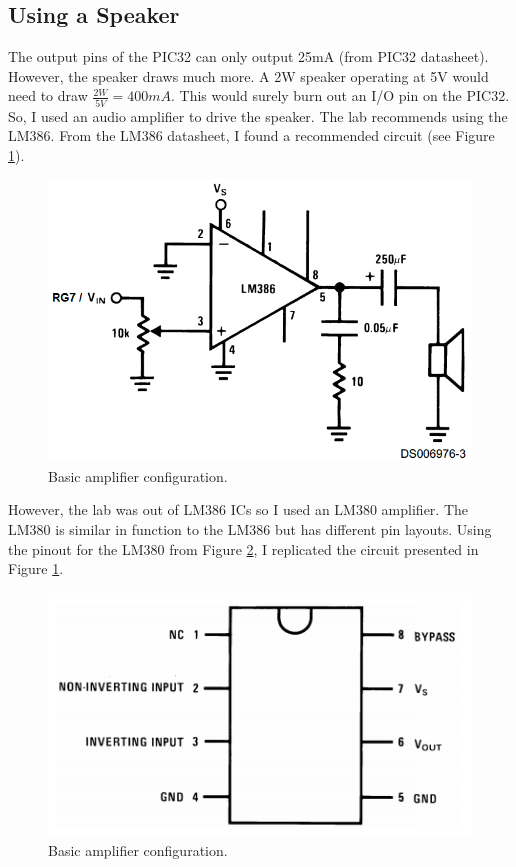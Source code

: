 \documentclass[11pt]{article}
\begin{document}
\subsection{Using a Speaker}

The output pins of the PIC32 can only output 25mA (from PIC32 datasheet). However, the speaker draws much more. A 2W speaker operating at 5V would need to draw $\frac{2W}{5V} = 400mA$. This would surely burn out an I/O pin on the PIC32. So, I used an audio amplifier to drive the speaker. The lab recommends using the LM386. From the LM386 datasheet, I found a recommended circuit (see Figure \ref{fig:amp_sch}). \\

\begin{figure}[h!]
\centering
\includegraphics[scale=0.7]{amp.png}
\caption{Basic amplifier configuration.}
\label{fig:amp_sch}
\end{figure} 
 
However, the lab was out of LM386 ICs so I used an LM380 amplifier. The LM380 is similar in function to the LM386 but has different pin layouts. Using the pinout for the LM380 from Figure \ref{fig:LM380_pin}, I replicated the circuit presented in Figure \ref{fig:amp_sch}. \\
 
\begin{figure}[h!]
\centering
\includegraphics[scale=0.8]{LM380_pin.png}
\caption{Basic amplifier configuration.}
\label{fig:LM380_pin}
\end{figure} 
\end{document}

